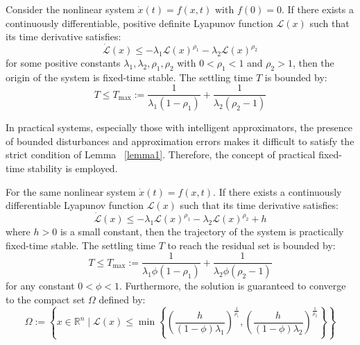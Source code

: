 \begin{lemma}
\label{lemma1}
Consider the nonlinear system $\dot{x}(t) = f(x,t)$ with $f(0)=0$. If there exists a continuously differentiable, positive definite Lyapunov function $\mathcal{L}(x)$ such that its time derivative satisfies:
\begin{equation}
    \dot{\mathcal{L}}(x) \le -\lambda_1 \mathcal{L}(x)^{\rho_1} - \lambda_2 \mathcal{L}(x)^{\rho_2}
\end{equation}
for some positive constants $\lambda_1, \lambda_2, \rho_1, \rho_2$ with $0 < \rho_1 < 1$ and $\rho_2 > 1$, then the origin of the system is fixed-time stable. The settling time $T$ is bounded by:
\begin{equation}
    T \le T_{\max} := \frac{1}{\lambda_1 (1 - \rho_1)} + \frac{1}{\lambda_2 (\rho_2 - 1)}
\end{equation}
\end{lemma}

In practical systems, especially those with intelligent approximators, the presence of bounded disturbances and approximation errors makes it difficult to satisfy the strict condition of Lemma ~\ref{lemma1}. Therefore, the concept of practical fixed-time stability is employed.

\begin{lemma}
\label{lemma2}
For the same nonlinear system $\dot{x}(t) = f(x,t)$. If there exists a continuously differentiable Lyapunov function $\mathcal{L}(x)$ such that its time derivative satisfies:
\begin{equation}
    \dot{\mathcal{L}}(x) \le -\lambda_1 \mathcal{L}(x)^{\rho_1} - \lambda_2 \mathcal{L}(x)^{\rho_2} + h
    \label{eq:pfts_condition}
\end{equation}
where $h > 0$ is a small constant, then the trajectory of the system is practically fixed-time stable. The settling time $T$ to reach the residual set is bounded by:
\begin{equation}
    T \le T_{\max} := \frac{1}{\lambda_1 \phi (1 - \rho_1)} + \frac{1}{\lambda_2 \phi (\rho_2 - 1)}
\end{equation}
for any constant $0 < \phi < 1$. Furthermore, the solution is guaranteed to converge to the compact set $\Omega$ defined by:
\begin{equation}
    \Omega := \left\{ x \in \mathbb{R}^n \mid \mathcal{L}(x) \le \min \left\{ \left(\frac{h}{(1-\phi)\lambda_1}\right)^{\frac{1}{\rho_1}}, \left(\frac{h}{(1-\phi)\lambda_2}\right)^{\frac{1}{\rho_2}} \right\} \right\}
\end{equation}
\end{lemma}

